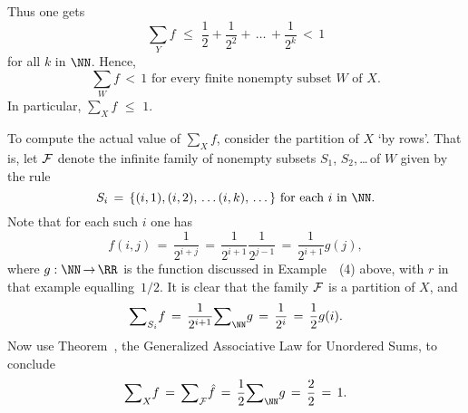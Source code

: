     Thus one gets
        \begin{displaymath}
        {\sum}_{Y} f\,\,{\leq}\,\,\frac{1}{2} + \frac{1}{2^{2}} + \,{\ldots}\,+\frac{1}{2^{k}}\,<\,1
        \end{displaymath}
    for all $k$ in ${\NN}$.
Hence,
        \begin{displaymath}
        {\sum}_{W} f\,<\,1 \mbox{ for every finite nonempty subset $W$ of $X$}.
        \end{displaymath}
    In particular, ${\sum}_{X} f\,\,{\leq}\,\,1$.

        To compute the actual value of ${\sum}_{X} f$, consider the partition of $X$ `by rows'.
    That is, let ${\cal F}$ denote the infinite family of nonempty subsets $S_{1}$, $S_{2}$,\,{\ldots}\,of $W$ given by the rule
        \begin{displaymath}
        S_{i} \,=\, \{(i,1), (i,2),\,{\ldots}\,(i,k),\,{\ldots}\,\} \mbox{ for each $i$ in ${\NN}$}.
        \end{displaymath}
    Note that for each such $i$ one has
        \begin{displaymath}
        f(i,j) \,=\, \frac{1}{2^{i+j}} \,=\, \frac{1}{2^{i+1}}\frac{1}{2^{j-1}} \,=\, 
    \frac{1}{2^{i+1}}g(j),
        \end{displaymath}
    where $g:{\NN} \,{\rightarrow}\, {\RR}$ is the function discussed in Example~~(4) above, with $r$ in that example equalling~$1/2$.
    It is clear that the family ${\cal F}$ is a partition of $X$, and 
        \begin{displaymath}
        {\sum}_{S_{i}} f \,=\, \frac{1}{2^{i+1}}{\sum}_{{\NN}} g \,=\, 
    \frac{1}{2^{i}} \,=\, \frac{1}{2}g(i).
        \end{displaymath}
    Now use Theorem~, the Generalized Associative Law for Unordered Sums, to conclude
        \begin{displaymath}
        {\sum}_{X} f \,=\, {\sum}_{{\cal F}} \hat{f} \,=\, \frac{1}{2}{\sum}_{{\NN}} g \,=\, \frac{2}{2} \,=\, 1.
        \end{displaymath}

\V

